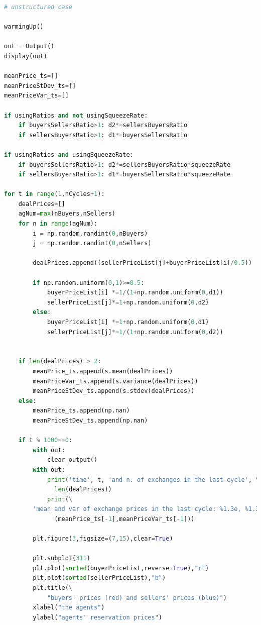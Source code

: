 \documentclass[10pt]{report}
\begin{document}
\begin{lstlisting}[language=Python, caption=The unstructured version, 
label={The unstructured version},basicstyle=\ttfamily\footnotesize]
# unstructured case

warmingUp()

out = Output()
display(out)

meanPrice_ts=[]
meanPriceStDev_ts=[]
meanPriceVar_ts=[]

if usingRatios and not usingSqueezeRate:
    if buyersSellersRatio>1: d2*=sellersBuyersRatio
    if sellersBuyersRatio>1: d1*=buyersSellersRatio
        
if usingRatios and usingSqueezeRate:
    if buyersSellersRatio>1: d2*=sellersBuyersRatio*squeezeRate
    if sellersBuyersRatio>1: d1*=buyersSellersRatio*squeezeRate

for t in range(1,nCycles+1):    
    dealPrices=[]
    agNum=max(nBuyers,nSellers)
    for n in range(agNum):
        i = np.random.randint(0,nBuyers)
        j = np.random.randint(0,nSellers)

        dealPrices.append((sellerPriceList[j]+buyerPriceList[i]/0.5))

        if np.random.uniform(0,1)>=0.5:    
            buyerPriceList[i] *=1/(1+np.random.uniform(0,d1))
            sellerPriceList[j]*=1+np.random.uniform(0,d2)
        else:
            buyerPriceList[i] *=1+np.random.uniform(0,d1)
            sellerPriceList[j]*=1/(1+np.random.uniform(0,d2))
        
           
    if len(dealPrices) > 2:
        meanPrice_ts.append(s.mean(dealPrices))
        meanPriceVar_ts.append(s.variance(dealPrices))
        meanPriceStDev_ts.append(s.stdev(dealPrices))
    else:
        meanPrice_ts.append(np.nan)
        meanPriceStDev_ts.append(np.nan)

    if t % 1000==0:
        with out:
            clear_output()
        with out:
            print('time', t, 'and n. of exchanges in the last cycle', \
              len(dealPrices))
            print(\
        'mean and var of exchange prices in the last cycle: %1.3e, %1.3e' %\
              (meanPrice_ts[-1],meanPriceVar_ts[-1]))

        plt.figure(3,figsize=(7,15),clear=True)

        plt.subplot(311)
        plt.plot(sorted(buyerPriceList,reverse=True),"r")
        plt.plot(sorted(sellerPriceList),"b")
        plt.title(\
            "buyers' prices (red) and sellers' prices (blue)")
        xlabel("the agents")
        ylabel("agents' reservation prices")


\end{lstlisting}
\end{document}
